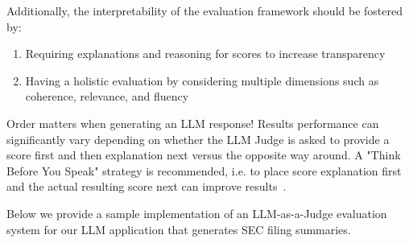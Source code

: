 Additionally, the interpretability of the evaluation framework should be fostered by:
\begin{enumerate}
    \item Requiring explanations and reasoning for scores to increase transparency
    \item Having a holistic evaluation by considering multiple dimensions such as coherence, relevance, and fluency
\end{enumerate}

\begin{kaobox}[frametitle=Important]
Order matters when generating an LLM response! Results performance can significantly vary depending on whether the LLM Judge is asked to provide a score first and then explanation next versus the opposite way around. A "Think Before You Speak" strategy is recommended, i.e. to place score explanation first and the actual resulting score next can improve results~.
\end{kaobox}

Below we provide a sample implementation of an LLM-as-a-Judge evaluation system for our LLM application that generates SEC filing summaries.~


